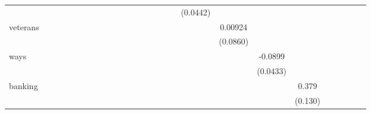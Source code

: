 \begin{tabular}{l*{25}{c}}
                    &            &            &            &            &            &            &            &            &            &            &            &            &            &            &            &            &    (0.0442)&            &            &            &            &            &            &            &            \\
veterans            &            &            &            &            &            &            &            &            &            &            &            &            &            &            &            &            &            &     0.00924&            &            &            &            &            &            &            \\
                    &            &            &            &            &            &            &            &            &            &            &            &            &            &            &            &            &            &    (0.0860)&            &            &            &            &            &            &            \\
ways                &            &            &            &            &            &            &            &            &            &            &            &            &            &            &            &            &            &            &     -0.0899&            &            &            &            &            &            \\
                    &            &            &            &            &            &            &            &            &            &            &            &            &            &            &            &            &            &            &    (0.0433)&            &            &            &            &            &            \\
banking             &            &            &            &            &            &            &            &            &            &            &            &            &            &            &            &            &            &            &            &       0.379&            &            &            &            &            \\
                    &            &            &            &            &            &            &            &            &            &            &            &            &            &            &            &            &            &            &            &     (0.130)&            &            &            &            &            \\

\end{tabular}
